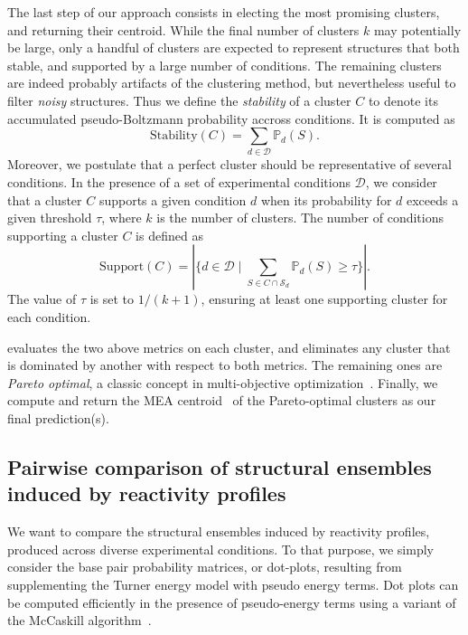 \documentclass[a4,center,fleqn]{NAR}
\newcommand{\Software}[1]{\text{\ttfamily\bfseries #1}}
\newcommand{\OurTool}{\Software{IPANEMAP}\xspace}
\newcommand{\NumClust}{k}
\newcommand{\Def}[1]{{\em #1}}
\begin{document}
The last step of our approach consists in electing the most promising clusters, and returning their centroid. While the final number of clusters $\NumClust$ may potentially be large, only a handful of clusters are expected to represent structures that both stable, and supported by a large number of conditions. The remaining clusters are indeed probably artifacts of the clustering method, but nevertheless useful to filter \emph{noisy} structures. Thus we define the \Def{stability} of a cluster $C$ to denote its accumulated pseudo-Boltzmann probability accross conditions. It is computed as 
\[\text{Stability}(C) = \sum_{d\in \mathcal{D}} \mathbb{P}_d(S).\]
Moreover, we postulate that a perfect cluster should be representative of several conditions. In the presence of a set of experimental conditions $\mathcal{D}$, we consider that a cluster $C$ supports a given condition $d$ when its probability for $d$ exceeds a given threshold $\tau$, where $\NumClust$ is the number of clusters. The number of conditions supporting a cluster $C$ is defined as
\[\text{Support}(C) = |\{d\in \mathcal{D} \mid \sum_{S\in C\cap \mathcal{S}_d} \mathbb{P}_d(S)\ge \tau \}|.\]
The value of $\tau$ is set to $1/(\NumClust+1)$, ensuring at least one supporting cluster for each condition.

\OurTool evaluates the two above metrics on each cluster, and eliminates any cluster that is dominated by another with respect to both metrics. The remaining ones are \Def{Pareto optimal}, a classic concept in multi-objective optimization~\cite{Mattson2005}. Finally, we compute and return the MEA centroid~\citep{Lu2009} of the Pareto-optimal clusters as our final prediction(s).



\subsection{Pairwise comparison of structural ensembles induced by reactivity profiles}\label{sec:dotplots}

We want to compare the structural ensembles induced by reactivity profiles, produced across diverse experimental conditions. To that purpose, we simply consider the base pair probability matrices, or dot-plots, resulting from supplementing the Turner energy model with pseudo energy terms. %
Dot plots can be computed efficiently in the presence of pseudo-energy terms using a variant of the McCaskill algorithm~\citep{McCaskill1990}.
\end{document}

